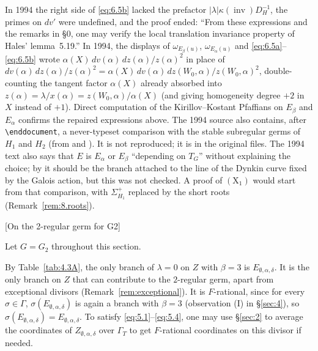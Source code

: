 \documentclass[12pt,letterpaper]{amsart}
\theoremstyle{plain}
\theoremstyle{definition}
\theoremstyle{remark}
\theoremstyle{definition}
\DeclareMathOperator{\inv}{inv}
\begin{document}
\begin{rem26}\label{rem:6.5}
In 1994 the right side of \eqref{eq:6.5b} lacked the prefactor
$|\lambda|\kappa(\inv)D_H^{-1}$, the primes on $dv'$ were undefined, and the
proof ended: ``From these expressions and the remarks in \S0, one may verify
the local translation invariance property of Hales' lemma~5.19.'' In 1994, the displays of $\omega_{E_\beta(u)}$, $\omega_{E_\alpha(u)}$ and
\eqref{eq:6.5a}--\eqref{eq:6.5b} wrote $\alpha(X)\,dv(\alpha)\,dz(\alpha)/z(\alpha)^2$
in place of $dv(\alpha)\,dz(\alpha)/z(\alpha)^2=\alpha(X)\,dv(\alpha)\,dz(W_0,\alpha)/z(W_0,\alpha)^2$,
double-counting the tangent factor $\alpha(X)$ already absorbed into
$z(\alpha)=\lambda/x(\alpha)=z(W_0,\alpha)/\alpha(X)$ (and giving homogeneity
degree $+2$ in $X$ instead of $+1$). Direct computation of the Kirillov--Kostant
Pfaffians on $E_\beta$ and $E_\alpha$ confirms the repaired expressions above. The 1994 source also
contains, after \verb|\enddocument|, a never-typeset comparison with the
stable subregular germs of $H_1$ and $H_2$ (from \cite{SS83} and
\cite{Re84}). It is not reproduced; it is in the original files. The 1994 text also says that $E$ is $E_\alpha$ or $E_\beta$
``depending on $T_G$'' without explaining the choice; by
\cite[Ch.~VI]{Ha92a} it should be the branch attached to the line of the
Dynkin curve fixed by the Galois action, but this was not checked. A proof of
$(\mathrm X_1)$ would start from that comparison, with $\Sigma_{H_1}^+$
replaced by the short roots (Remark~\ref{rem:8.roots}).
\end{rem26}

[On the 2-regular germ for G2]\label{sec:7}

Let $G=G_2$ throughout this section.

By Table~\ref{tab:4.3A}, the only branch of $\lambda=0$ on $Z$ with
$\beta=3$ is $E_{\emptyset,\alpha,\delta}$. It is the only branch on $Z$
that can contribute to the $2$-regular germ, apart from exceptional
divisors (Remark~\ref{rem:exceptional}). It is $F$-rational, since for every
$\sigma\in\Gamma$, $\sigma(E_{\emptyset,\alpha,\delta})$
is again a branch with $\beta=3$ (observation (I) in \S\ref{sec:4}),
so $\sigma(E_{\emptyset,\alpha,\delta})=E_{\emptyset,\alpha,\delta}$.
To satisfy \eqref{eq:5.1}--\eqref{eq:5.4}, one may use
\S\ref{sec:2} to average the coordinates of
$Z_{\emptyset,\alpha,\delta}$
over $\Gamma_T$ to get $F$-rational coordinates on this divisor if needed.
\end{document}
